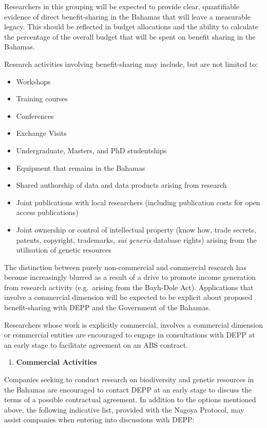 \documentclass[
]{book}
\providecommand{\tightlist}{%
  \setlength{\itemsep}{0pt}\setlength{\parskip}{0pt}}
\begin{document}
Researchers in this grouping will be expected to provide clear, quantifiable evidence of direct benefit-sharing in the Bahamas that will leave a measurable legacy. This should be reflected in budget allocations and the ability to calculate the percentage of the overall budget that will be spent on benefit sharing in the Bahamas.

Research activities involving benefit-sharing may include, but are not limited to:

\begin{itemize}
\tightlist
\item
  Workshops
\item
  Training courses
\item
  Conferences
\item
  Exchange Visits
\item
  Undergraduate, Masters, and PhD studentships
\item
  Equipment that remains in the Bahamas
\item
  Shared authorship of data and data products arising from research
\item
  Joint publications with local researchers (including publication costs for open access publications)
\item
  Joint ownership or control of intellectual property (know how, trade secrets, patents, copyright, trademarks, \emph{sui generis} database rights) arising from the utilisation of genetic resources
\end{itemize}

The distinction between purely non-commercial and commercial research has become increasingly blurred as a result of a drive to promote income generation from research activity (e.g.~arising from the Bayh-Dole Act). Applications that involve a commercial dimension will be expected to be explicit about proposed benefit-sharing with DEPP and the Government of the Bahamas.

Researchers whose work is explicitly commercial, involves a commercial dimension or commercial entities are encouraged to engage in consultations with DEPP at an early stage to facilitate agreement on an ABS contract.

\begin{enumerate}
\def\labelenumi{\arabic{enumi}.}
\setcounter{enumi}{2}
\tightlist
\item
  \textbf{Commercial Activities}
\end{enumerate}

Companies seeking to conduct research on biodiversity and genetic resources in the Bahamas are encouraged to contact DEPP at an early stage to discuss the terms of a possible contractual agreement. In addition to the options mentioned above, the following indicative list, provided with the Nagoya Protocol, may assist companies when entering into discussions with DEPP:
\end{document}
